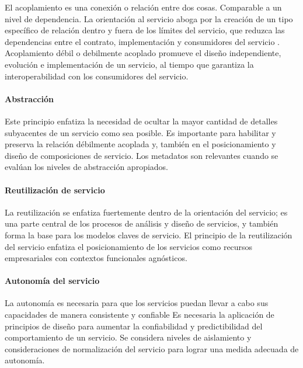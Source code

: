  	El \gls{acoplamiento} es una conexión o relación entre dos cosas. Comparable a un nivel de dependencia. 
 	La orientaci\'on al servicio aboga por la creación de un tipo específico de relación dentro y fuera de los límites del servicio, que reduzca las dependencias entre el contrato, implementación y consumidores del servicio .
 	Acoplamiento débil o \gls{debilmente acoplado} promueve el diseño independiente, evolución e implementación de un servicio, al tiempo que garantiza la interoperabilidad con los consumidores del servicio.   
 	
 	\paragraph{Abstracción}
 	  
 	 Este principio enfatiza la necesidad de ocultar la mayor cantidad de detalles subyacentes de un servicio como sea posible. 
 	Es importante para habilitar y preserva la relación débilmente acoplada y, también en el posicionamiento y diseño de composiciones de servicio.
 	 Los metadatos son relevantes cuando se evalúan los niveles de abstracción apropiados.   
 	
 		
 	\paragraph{Reutilización de servicio}
 	  La reutilización se enfatiza fuertemente dentro de la orientación del servicio; es una parte central de los  procesos de análisis y diseño de servicios, y también forma la base para los modelos claves de servicio.
 	 El principio de la reutilización del servicio enfatiza el posicionamiento de los servicios como recursos empresariales con contextos funcionales agnósticos.   
 	 
 	 
 	 \paragraph{Autonomía del servicio}
 	  
 	  La autonomía es necesaria para que los servicios puedan llevar a cabo sus capacidades de manera consistente y confiable
 	 Es necesaria la aplicación de principios de diseño para aumentar la confiabilidad y predictibilidad del comportamiento de un servicio.   
 	 Se considera niveles de aislamiento y consideraciones de normalización del servicio para lograr una medida adecuada de autonomía.  
 	  
